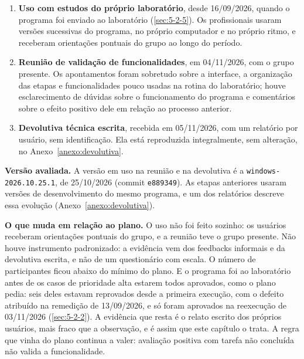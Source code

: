 \begin{enumerate}
\item \textbf{Uso com estudos do próprio laboratório}, desde 16/09/2026, quando o programa foi enviado ao laboratório (\ref{sec:5-2-5}). Os profissionais usaram versões sucessivas do programa, no próprio computador e no próprio ritmo, e receberam orientações pontuais do grupo ao longo do período.
\item \textbf{Reunião de validação de funcionalidades}, em 04/11/2026, com o grupo presente. Os apontamentos foram sobretudo sobre a interface, a organização das etapas e funcionalidades pouco usadas na rotina do laboratório; houve esclarecimento de dúvidas sobre o funcionamento do programa e comentários sobre o efeito positivo dele em relação ao processo anterior.
\item \textbf{Devolutiva técnica escrita}, recebida em 05/11/2026, com um relatório por usuário, sem identificação. Ela está reproduzida integralmente, sem alteração, no Anexo~\ref{anexo:devolutiva}.
\end{enumerate}


\textbf{Versão avaliada.} A versão em uso na reunião e na devolutiva é a \texttt{windows-\allowbreak{}2026.\allowbreak{}10.\allowbreak{}25.\allowbreak{}1}, de 25/10/2026 (commit \texttt{e889349}). As etapas anteriores usaram versões de desenvolvimento do mesmo programa, e um dos relatórios descreve essa evolução (Anexo~\ref{anexo:devolutiva}).


\textbf{O que muda em relação ao plano.} O uso não foi feito sozinho: os usuários receberam orientações pontuais do grupo, e a reunião teve o grupo presente. Não houve instrumento padronizado: a evidência vem dos feedbacks informais e da devolutiva escrita, e não de um questionário com escala. O número de participantes ficou abaixo do mínimo do plano. E o programa foi ao laboratório antes de os casos de prioridade alta estarem todos aprovados, como o plano pedia: seis deles estavam reprovados desde a primeira execução, com o defeito atribuído na remedição de 13/09/2026, e só foram aprovados na reexecução de 03/11/2026 (\ref{sec:5-2-2}). A evidência que resta é o relato escrito dos próprios usuários, mais fraco que a observação, e é assim que este capítulo o trata. A regra que vinha do plano continua a valer: avaliação positiva com tarefa não concluída não valida a funcionalidade.


